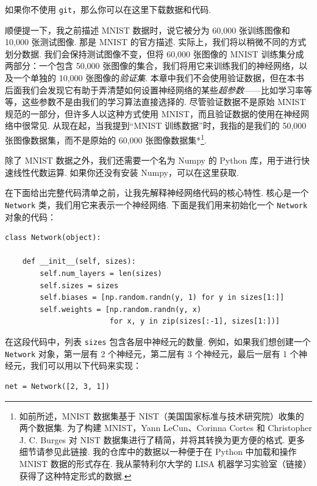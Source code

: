 如果你不使用 \texttt{git}，那么你可以在这里下载数据和代码.

顺便提一下，我之前描述 MNIST 数据时，说它被分为 60,000 张训练图像和 10,000 张测试图像. 那是 MNIST 的官方描述. 实际上，我们将以稍微不同的方式划分数据. 我们会保持测试图像不变，但将 60,000 张图像的 MNIST 训练集分成两部分：一个包含 50,000 张图像的集合，我们将用它来训练我们的神经网络，以及一个单独的 10,000 张图像的\emph{验证集}. 本章中我们不会使用验证数据\label{term:38}，但在本书后面我们会发现它有助于弄清楚如何设置神经网络的某些\emph{超参数}——比如学习率等等，这些参数不是由我们的学习算法直接选择的. 尽管验证数据不是原始 MNIST 规范的一部分，但许多人以这种方式使用 MNIST，而且验证数据的使用在神经网络中很常见. 从现在起，当我提到``MNIST 训练数据''时，我指的是我们的 50,000 张图像数据集，而不是原始的 60,000 张图像数据集*\footnote{如前所述，MNIST 数据集基于 NIST（美国国家标准与技术研究院）收集的两个数据集. 为了构建 MNIST，Yann LeCun、Corinna Cortes 和 Christopher J. C. Burges 对 NIST 数据集进行了精简，并将其转换为更方便的格式. 更多细节请参见此链接. 我的仓库中的数据以一种便于在 Python 中加载和操作 MNIST 数据的形式存在. 我从蒙特利尔大学的 LISA 机器学习实验室（链接）获得了这种特定形式的数据.}.

除了 MNIST 数据之外，我们还需要一个名为 Numpy 的 Python 库，用于进行快速线性代数运算. 如果你还没有安装 Numpy，可以在这里获取.

在下面给出完整代码清单之前，让我先解释神经网络代码的核心特性. 核心是一个 \texttt{Network} 类，我们用它来表示一个神经网络. 下面是我们用来初始化一个 \texttt{Network} 对象的代码：

\begin{lstlisting}
class Network(object):

    def __init__(self, sizes):
        self.num_layers = len(sizes)
        self.sizes = sizes
        self.biases = [np.random.randn(y, 1) for y in sizes[1:]]
        self.weights = [np.random.randn(y, x)
                        for x, y in zip(sizes[:-1], sizes[1:])]

\end{lstlisting}

在这段代码中，列表 \texttt{sizes} 包含各层中神经元的数量. 例如，如果我们想创建一个 \texttt{Network} 对象，第一层有 2 个神经元，第二层有 3 个神经元，最后一层有 1 个神经元，我们可以用以下代码来实现：

\begin{lstlisting}
net = Network([2, 3, 1])

\end{lstlisting}

